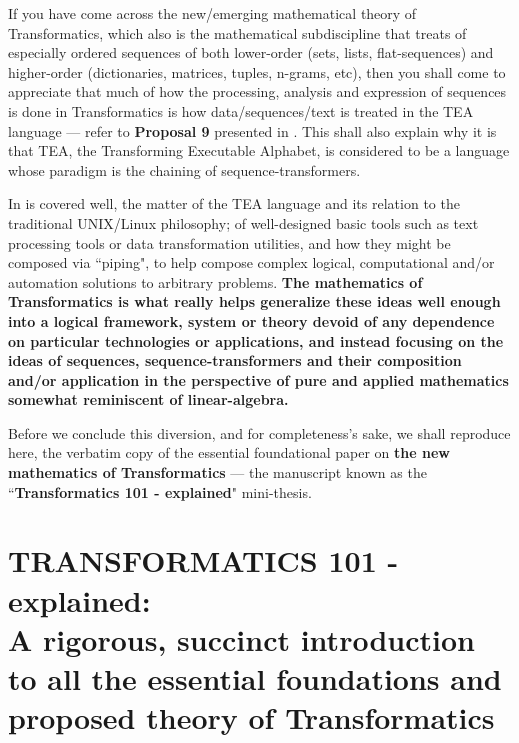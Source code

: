\documentclass[a4paper, 18pt]{book} %
\begin{document}
If you have come across the new/emerging mathematical theory of Transformatics\cite{Lutalo2025_transformatics_thesis}, which also is the mathematical subdiscipline that treats of especially ordered sequences of both lower-order\cite{Lutalo2025_transformatics_thesis} (sets, lists, flat-sequences) and higher-order\cite{Lutalo2025_transformatics_thesis} (dictionaries, matrices, tuples, n-grams, etc), then you shall come to appreciate that much of how the processing, analysis and expression of sequences is done in Transformatics is how data/sequences/text is treated in the TEA language --- refer to \textbf{Proposal 9} presented in \cite{Lutalo2025_transformatics_thesis}. This shall also explain why it is that TEA, the Transforming Executable Alphabet, is considered to be a language whose paradigm is the chaining of sequence-transformers.

\vspace{1em}

In \cite{cli_tttt} is covered well, the matter of the TEA language and its relation to the traditional UNIX/Linux philosophy; of well-designed basic tools such as text processing tools or data transformation utilities, and how they might be composed via ``piping", to help compose complex logical, computational and/or automation solutions to arbitrary problems. \textbf{The mathematics of Transformatics is what really helps generalize these ideas well enough into a logical framework, system or theory devoid of any dependence on particular technologies or applications, and instead focusing on the ideas of sequences, sequence-transformers and their composition and/or application in the perspective of pure and applied mathematics somewhat reminiscent of linear-algebra.}

\vspace{2em}

Before we conclude this diversion, and for completeness's sake, we shall reproduce here, the verbatim copy of the essential foundational paper on \textbf{the new mathematics of Transformatics} --- the manuscript\cite{Lutalo2025_transformatics_thesis} known as the ``\textbf{Transformatics 101 - explained}" mini-thesis. 






\chapter{TRANSFORMATICS 101 - explained:\\\small{A rigorous, succinct introduction to all the essential foundations and proposed theory of Transformatics}}
\label{CHAPTRANS}
\end{document}
